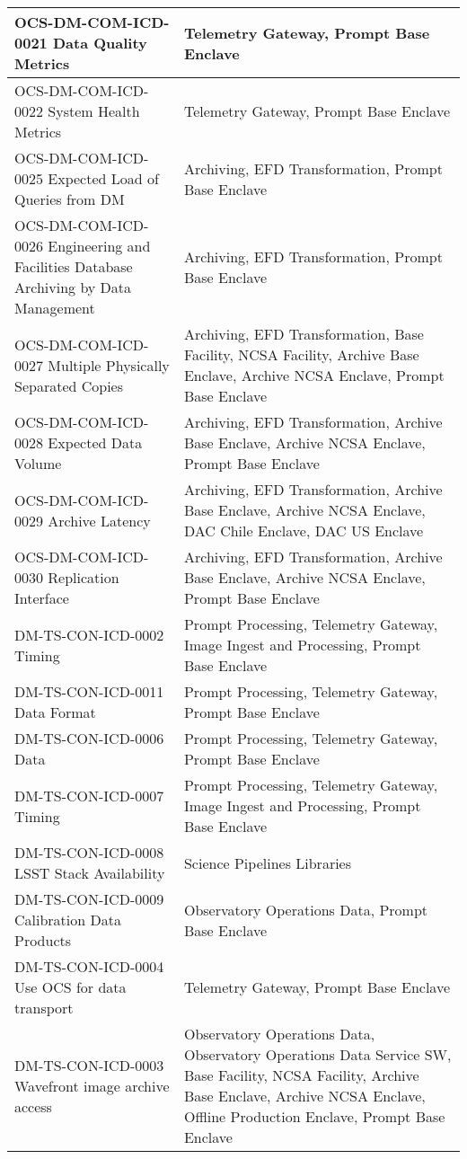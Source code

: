 \begin{xtabular}{p{0.4\textwidth}p{0.55\textwidth}}
OCS-DM-COM-ICD-0021 Data Quality Metrics & Telemetry Gateway, Prompt Base Enclave \\ \hline
OCS-DM-COM-ICD-0022 System Health Metrics & Telemetry Gateway, Prompt Base Enclave \\ \hline
OCS-DM-COM-ICD-0025 Expected Load of Queries from DM & Archiving, EFD Transformation, Prompt Base Enclave \\ \hline
OCS-DM-COM-ICD-0026 Engineering and Facilities Database Archiving by Data Management & Archiving, EFD Transformation, Prompt Base Enclave \\ \hline
OCS-DM-COM-ICD-0027 Multiple Physically Separated Copies & Archiving, EFD Transformation, Base Facility, NCSA Facility, Archive Base Enclave, Archive NCSA Enclave, Prompt Base Enclave \\ \hline
OCS-DM-COM-ICD-0028 Expected Data Volume & Archiving, EFD Transformation, Archive Base Enclave, Archive NCSA Enclave, Prompt Base Enclave \\ \hline
OCS-DM-COM-ICD-0029 Archive Latency & Archiving, EFD Transformation, Archive Base Enclave, Archive NCSA Enclave, DAC Chile Enclave, DAC US Enclave \\ \hline
OCS-DM-COM-ICD-0030 Replication Interface & Archiving, EFD Transformation, Archive Base Enclave, Archive NCSA Enclave, Prompt Base Enclave \\ \hline
DM-TS-CON-ICD-0002 Timing & Prompt Processing, Telemetry Gateway, Image Ingest and Processing, Prompt Base Enclave \\ \hline
DM-TS-CON-ICD-0011 Data Format & Prompt Processing, Telemetry Gateway, Prompt Base Enclave \\ \hline
DM-TS-CON-ICD-0006 Data & Prompt Processing, Telemetry Gateway, Prompt Base Enclave \\ \hline
DM-TS-CON-ICD-0007 Timing & Prompt Processing, Telemetry Gateway, Image Ingest and Processing, Prompt Base Enclave \\ \hline
DM-TS-CON-ICD-0008 LSST Stack Availability & Science Pipelines Libraries \\ \hline
DM-TS-CON-ICD-0009 Calibration Data Products & Observatory Operations Data, Prompt Base Enclave \\ \hline
DM-TS-CON-ICD-0004 Use OCS for data transport & Telemetry Gateway, Prompt Base Enclave \\ \hline
DM-TS-CON-ICD-0003 Wavefront image archive access & Observatory Operations Data, Observatory Operations Data Service SW, Base Facility, NCSA Facility, Archive Base Enclave, Archive NCSA Enclave, Offline Production Enclave, Prompt Base Enclave \\ \hline

\end{xtabular}
